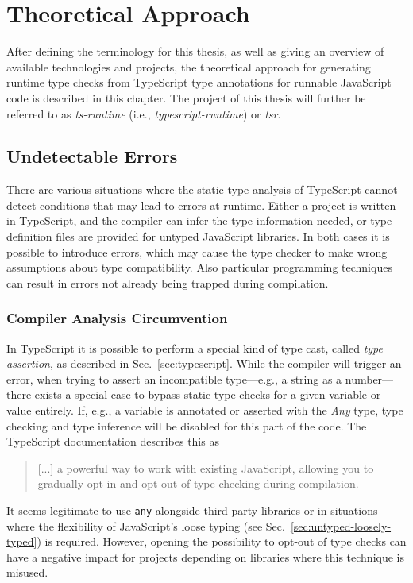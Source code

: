 \chapter{Theoretical Approach}
\label{cha:theoretical-approach}

After defining the terminology for this thesis, as well as giving an overview of available technologies and projects, the theoretical approach for generating runtime type checks from TypeScript type annotations for runnable JavaScript code is described in this chapter. The project of this thesis will further be referred to as \emph{ts-runtime} (i.e., \emph{typescript-runtime}) or \emph{tsr}.

\section{Undetectable Errors}
\label{sec:undetectable-errors}

There are various situations where the static type analysis of TypeScript cannot detect conditions that may lead to errors at runtime. Either a project is written in TypeScript, and the compiler can infer the type information needed, or type definition files are provided for untyped JavaScript libraries. In both cases it is possible to introduce errors, which may cause the type checker to make wrong assumptions about type compatibility. Also particular programming techniques can result in errors not already being trapped during compilation.

\subsection{Compiler Analysis Circumvention}
\label{sec:compiler-analysis-circumvention}

In TypeScript it is possible to perform a special kind of type cast, called \emph{type assertion}, as described in Sec.~\ref{sec:typescript}. While the compiler will trigger an error, when trying to assert an incompatible type---e.g.,  a string as a number---there exists a special case to bypass static type checks for a given variable or value entirely. If, e.g., a variable is annotated or asserted with the \emph{Any} type, type checking and type inference will be disabled for this part of the code. The TypeScript documentation describes this as 
\begin{quote}
   [...] a powerful way to work with existing JavaScript, allowing you to gradually opt-in and opt-out of type-checking during compilation.~\cite{TypeScriptHandbook:BasicTypes}
\end{quote}
It seems legitimate to use \texttt{any} alongside third party libraries or in situations where the flexibility of JavaScript's loose typing (see Sec.~\ref{sec:untyped-loosely-typed}) is required. However, opening the possibility to opt-out of type checks can have a negative impact for projects depending on libraries where this technique is misused.

